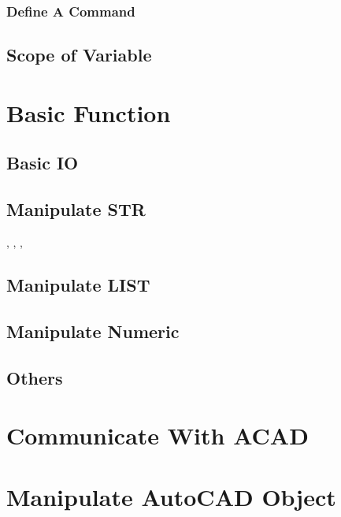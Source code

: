 \subsubsection{Define A Command}

\subsection{Scope of Variable}

\section{Basic Function}

\subsection{Basic IO}

\subsection{Manipulate STR}

, , , \par


\subsection{Manipulate LIST}

\subsection{Manipulate Numeric}

\subsection{Others}

\section{Communicate With ACAD}

\section{Manipulate AutoCAD Object}
